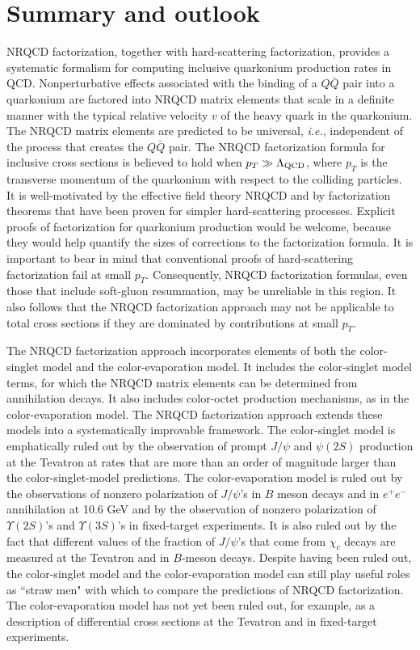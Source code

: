 \section{Summary and outlook}
\label{prodsec:summary}

NRQCD factorization, together with hard-scattering factorization,  
provides a systematic formalism for computing
inclusive quarkonium production rates in QCD. 
Nonperturbative effects associated with the binding of
a $Q \bar Q$ pair into a quarkonium are factored into
NRQCD matrix elements that scale in a definite manner with 
the typical relative velocity $v$ of the heavy quark in the quarkonium.
The NRQCD matrix elements are predicted to be universal, {\it i.e.},
independent of the process that creates the $Q \bar Q$ pair. The NRQCD
factorization formula for inclusive cross sections is believed to hold
when $p_T \gg \Lambda_{\rm QCD}$, where $p_T$ is the transverse momentum
of the quarkonium with respect to the colliding particles.  It is
well-motivated by the effective field theory NRQCD and by factorization
theorems that have been proven for simpler hard-scattering processes. 
Explicit proofs of factorization for quarkonium production would be
welcome, because they would help quantify the sizes of corrections to
the factorization formula. It is important to bear in mind that
conventional proofs of hard-scattering factorization fail at small
$p_T$. Consequently, NRQCD factorization formulas, even those that
include soft-gluon resummation, may be unreliable in this region. It
also follows that the NRQCD factorization approach may not be applicable
to total cross sections if they are dominated by contributions at
small $p_T$.

The NRQCD factorization approach incorporates elements of both the 
color-singlet model and the color-evaporation model.  It includes the 
color-singlet model terms, for which the NRQCD matrix elements can be 
determined from annihilation decays.  It also includes color-octet 
production mechanisms, as in the color-evaporation model.  The NRQCD 
factorization approach extends these models into a 
systematically improvable framework.  The color-singlet model is
emphatically ruled out by the observation of prompt $J/\psi$ and 
$\psi(2S)$ production at the Tevatron at rates that are more 
than an order 
of magnitude larger than the color-singlet-model predictions.  
The color-evaporation model is ruled out by the observations 
of nonzero polarization of $J/\psi$'s 
in $B$ meson decays and in $e^+e^-$ annihilation at 10.6 GeV and by 
the observation of nonzero polarization of $\Upsilon(2S)$'s and 
$\Upsilon(3S)$'s in fixed-target experiments.   
It is also ruled out by the fact that different values of
the fraction of $J/\psi$'s that come from $\chi_c$ decays
are measured at the Tevatron and in $B$-meson decays.
Despite having been ruled out, 
the color-singlet model and the color-evaporation model can 
still play  useful roles as ``straw men" with which to compare the
predictions of NRQCD factorization. The color-evaporation model 
has not yet been ruled out, for example,  
as a description of differential cross
sections at the Tevatron and in fixed-target experiments.

